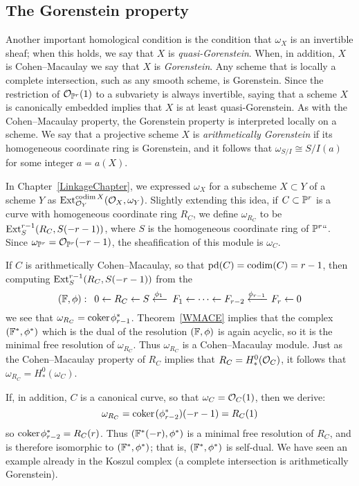 \subsection*{The Gorenstein property}
Another important homological condition is the condition that
$\omega_X$ is an invertible sheaf; when this holds, we say that $X$
is \emph{quasi-Gorenstein}. When, in addition, $X$ is Cohen--Macaulay
%
%
we say that $X$ is \emph{Gorenstein}. Any scheme that is locally a
complete intersection, such as any smooth scheme, is Gorenstein. Since
the restriction
of ${\mathcal O}_{\mathbb P^r}(1)$ to a subvariety is always invertible, saying that
a scheme $X$ is canonically embedded implies that
$X$ is at least quasi-Gorenstein. As with the Cohen--Macaulay property,
the Gorenstein property is interpreted locally
on a scheme. We say that a projective scheme $X$ is
\emph{arithmetically Gorenstein}
%
if its homogeneous coordinate ring is Gorenstein, and it follows that
$\omega_{S/I} \cong S/I(a)$ for some integer $a = a(X)$.

In Chapter~\ref{LinkageChapter},  we expressed $\omega_X$
for a subscheme $X\subset Y$ of a scheme $Y$ as
${\rm{Ext}}^{\operatorname{codim} X}_{{\mathcal O}_Y}({\mathcal O}_X, \omega_Y)$. Slightly extending this idea,
if $C\subset \mathbb P^r$ is a curve
with homogeneous coordinate ring $R_{C}$,
we define $\omega_{R_C}$ to be ${\rm{Ext}}^{r-1}_S(R_C, S(-r-1))$, where $S$
is the homogeneous coordinate ring of $\mathbb P^r` `$.
Since $\omega_{\mathbb P^r} = {\mathcal O}_{\mathbb P^r}(-r-1)$, the sheafification of this
module is  $\omega_C$.

If $C$ is arithmetically Cohen--Macaulay, so that
$\operatorname{pd} (C) = \operatorname{codim}(C) = r-1$,  then
computing ${\rm{Ext}}^{r-1}_S(R_C, S(-r-1))$ from the 
%
$$
(\FF, \phi):\quad 
0\leftarrow R_C \leftarrow S\luto{\phi_1} F_1 \leftarrow \cdots \leftarrow 
F_{r-2} \luto{\!\phi_{r-1}}\hskip-15pt-\ F_r\leftarrow 0
$$
we see that $\omega_{R_C} = {\rm{coker}\kern1pt} \phi_{r-1}^*$. 
%
Theorem~\ref{WMACE}
implies that the complex $({\mathbb F}^*, \phi^*)$ which is the dual
of the  resolution $({\mathbb F}, \phi)$ is again acyclic, so it is the minimal
free resolution of $\omega_{R_C}$. Thus
$\omega_{R_C}$ is a Cohen--Macaulay module. Just as the Cohen--Macaulay
property of
$R_C$ implies that $R_C = H^0_*({\mathcal O}_C)$, it follows that $\omega_{R_C}
= H^0_*(\omega_C)$.

If, in addition, $C$ is a canonical curve, so that $\omega_C = {\mathcal O}_C(1)$,
then we derive:
$$
\omega_{R_C} = {\rm{coker}\kern1pt}(\phi_{r-2}^*)(-r-1) = R_C(1)
$$
so ${\rm{coker}\kern1pt} \phi_{r-2}^* = R_C(r)$. Thus $({\mathbb F}^*(-r), \phi^*)$ is a
minimal free resolution of $R_C$, and is therefore isomorphic to
$({\mathbb F}^*, \phi^*)$; that is, $({\mathbb F}^*, \phi^*)$ is self-dual.
We have seen an example already
in the Koszul complex (a complete intersection is arithmetically Gorenstein).

